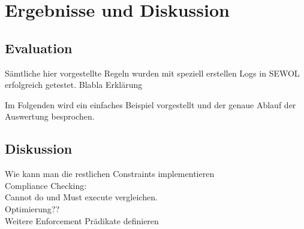 
\chapter{Ergebnisse und Diskussion} %

\label{Chapter5} %

\section{Evaluation}
Sämtliche hier vorgestellte Regeln wurden mit speziell erstellen Logs in SEWOL erfolgreich getestet. Blabla Erklärung

Im Folgenden wird ein einfaches Beispiel vorgestellt und der genaue Ablauf der Auswertung besprochen.

\section{Diskussion}


Wie kann man die restlichen Constraints implementieren\\
Compliance Checking:\\
Cannot do und Must execute vergleichen.\\
Optimierung??\\
Weitere Enforcement Prädikate definieren



